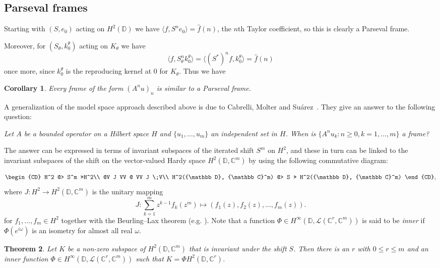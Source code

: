 \documentclass[11pt]{amsart}
\newtheorem{thm}{Theorem}[section]
\newtheorem{cor}[thm]{Corollary}
\theoremstyle{definition}
\theoremstyle{remark}
\numberwithin{equation}{section}
\def\CC{{\mathbb C}}
\def\DD{{\mathbb D}}
\def\LL{\mathcal L}
\begin{document}
\subsection{Parseval frames}




Starting with $(S, e_0)$ acting on $H^2(\DD)$ we have $\langle f, S^n e_0 \rangle = \hat f(n)$,
the $n$th Taylor coefficient,
so this is clearly a Parseval frame.

Moreover, for  $(S_\theta, k_0^\theta)$ acting on $K_\theta$ we have
\[
\langle f, S_\theta^n k_0^\theta \rangle = \langle (S^*)^n f, k_0^\theta\rangle = \hat f(n)
\]
once more, since $k_0^\theta$ is the reproducing kernel at $0$  for $K_\theta$.
Thus we have
\begin{cor}
Every frame of the form $(A^n u)_n$ is similar to a Parseval frame.
\end{cor}

A generalization of the model space approach described above is due to
Cabrelli, Molter and Su\'arez~\cite{CMS23}.
They give an answer to the following question:

{\em
Let $A$ be a bounded operator on a Hilbert space $H$ and $\{u_1,\ldots,u_m\}$ an
independent  set in  $H$. When is
$\{A^n u_k: n \ge 0, k=1,\ldots,m\}$   a frame?}

The answer can be expressed in terms of invariant subspaces of the iterated shift $S^m$
on $H^2$, and these in turn can be linked to the invariant subspaces of
the shift on the vector-valued Hardy space $H^2(\DD,\CC^m)$ by using the
 following commutative diagram:

\begin{align*}\begin{CD}
H^2 @> S^m  >>H^2\\
@V J   VV @ VV J \;V\\
H^2(\DD, \CC^m) @> S >> H^2(\DD, \CC^m)
\end{CD},  \end{align*}
where $J: H^2 \to H^2(\DD, \CC^m)$ is the unitary mapping
\[
J: \sum_{k=1}^m z^{k-1}f_k(z^m) \mapsto (f_1(z),f_2(z),\ldots, f_m(z)).
\]
for $f_1,\ldots, f_m \in H^2$ together with the
Beurling--Lax theorem (e.g. \cite[Thm.~3.1.7]{LOLS}).
Note that a function $\Phi \in H^\infty(\DD, \LL(\CC^r,\CC^m))$ is said to be {\em inner\/} if
$\Phi(e^{i\omega})$ is an isometry for almost all real $\omega$.


\begin{thm}\label{thm:kinvsub}
Let $K$ be a non-zero subspace of $H^2(\DD, \CC^m)$ that is invariant under the
shift $S$. Then there is an $r$ with $0 \le r \le m$ and an inner function
$\Phi \in H^\infty(\DD,  \LL(\CC^r,\CC^m))$ such that $K=\Phi H^2(\DD, \CC^r)$.
\end{thm}
\end{document}
